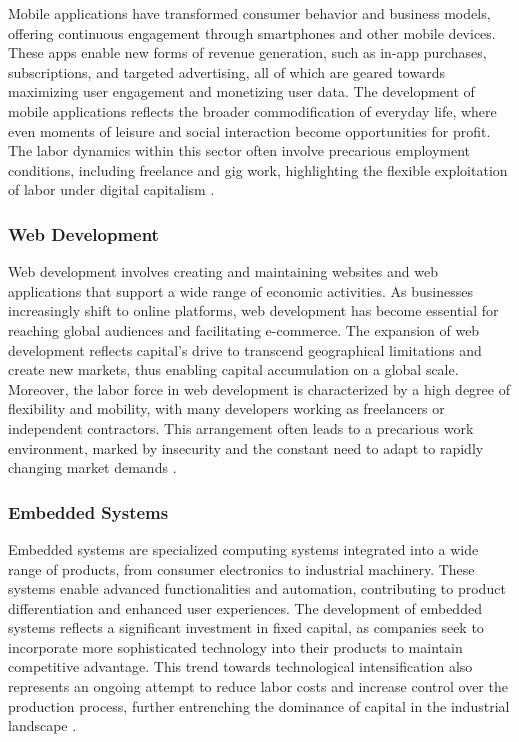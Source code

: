 \begin{refsection}
Mobile applications have transformed consumer behavior and business models, offering continuous engagement through smartphones and other mobile devices. These apps enable new forms of revenue generation, such as in-app purchases, subscriptions, and targeted advertising, all of which are geared towards maximizing user engagement and monetizing user data. The development of mobile applications reflects the broader commodification of everyday life, where even moments of leisure and social interaction become opportunities for profit. The labor dynamics within this sector often involve precarious employment conditions, including freelance and gig work, highlighting the flexible exploitation of labor under digital capitalism \cite[pp.~109-112]{fuchs2018digital}.

\subsubsection{Web Development}

Web development involves creating and maintaining websites and web applications that support a wide range of economic activities. As businesses increasingly shift to online platforms, web development has become essential for reaching global audiences and facilitating e-commerce. The expansion of web development reflects capital's drive to transcend geographical limitations and create new markets, thus enabling capital accumulation on a global scale. Moreover, the labor force in web development is characterized by a high degree of flexibility and mobility, with many developers working as freelancers or independent contractors. This arrangement often leads to a precarious work environment, marked by insecurity and the constant need to adapt to rapidly changing market demands \cite[pp.~75-77]{schiller2014digital}.

\subsubsection{Embedded Systems}

Embedded systems are specialized computing systems integrated into a wide range of products, from consumer electronics to industrial machinery. These systems enable advanced functionalities and automation, contributing to product differentiation and enhanced user experiences. The development of embedded systems reflects a significant investment in fixed capital, as companies seek to incorporate more sophisticated technology into their products to maintain competitive advantage. This trend towards technological intensification also represents an ongoing attempt to reduce labor costs and increase control over the production process, further entrenching the dominance of capital in the industrial landscape \cite[pp.~221-223]{beniger2009control}.


\end{refsection}
